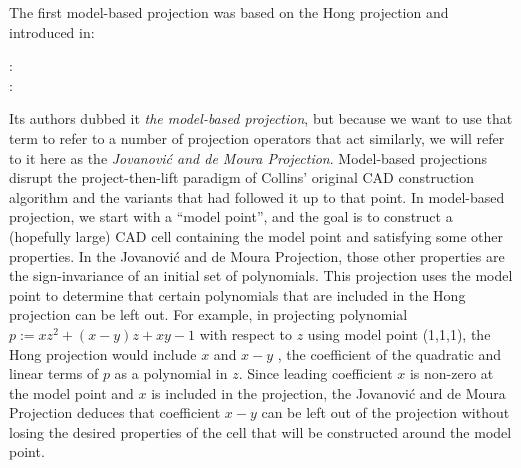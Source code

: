 \documentclass{article}
\begin{document}
The first model-based projection was based on the Hong projection and
introduced in:
%
\begin{description}
\item[\autocite{JovanovicdeMoura:12} :]  
\item[\autocite{Jovanovic:2013} :]  
\end{description}
%
Its authors dubbed it \emph{the model-based projection}, but because
we want to use that term to refer to a number of projection
operators that act similarly, we will refer to it here as the
\emph{Jovanovi\'c and de Moura Projection}.
Model-based projections disrupt the project-then-lift paradigm of
Collins' original CAD construction algorithm and the variants that had
followed it up to that point.  In model-based projection, we start
with a ``model point'', and the goal is to construct a (hopefully
large) CAD cell containing the model point and satisfying some other
properties.  In the Jovanovi\'c and de Moura Projection, those other
properties are the sign-invariance of an initial set of polynomials.
This projection uses the model point to determine that certain
polynomials that are included in the Hong projection can be left out.
For example, in projecting polynomial $p := x z^2 + (x - y) z + x y - 1$ with respect
to $z$ using model point (1,1,1), the Hong projection would include
$x$ and $x - y$ , the coefficient of the quadratic and
linear terms of $p$ as a polynomial in $z$.  Since leading coefficient
$x$ is non-zero at the model
point and $x$ is included in the projection, the 
Jovanovi\'c and de Moura Projection deduces that coefficient $x-y$ can
be left out of the projection without losing the desired properties of
the cell that will be constructed around the model point.  

\end{document}
